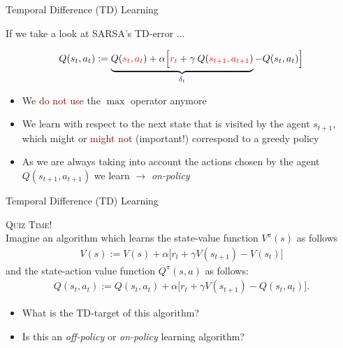 \documentclass{beamer}
\newenvironment{takeaway}[1]{%
	\definecolor{shadecolor}{gray}{0.9}%
		\begin{shaded}{\color{skymagenta}\noindent\textsc{#1}}\\%
		}{%
		\end{shaded}%
}
\begin{document}
\begin{frame}{Temporal Difference (TD) Learning}

		If we take a look at SARSA's TD-error ...

		\begin{align*}
			Q(s_t,a_t):=\underbrace{Q(\textcolor{red}{s_t,a_t}) + \alpha\Big[\textcolor{red}{r_t} + \gamma \: Q(\textcolor{red}{s_{t+1},a_{t+1}})}_{\textcolor{blue}{\delta_t}} - Q(s_t, a_t) \Big]
		\end{align*}


		\begin{itemize}
			\item We \textcolor{Maroon}{do not use} the $\max$ operator anymore
			\item We learn with respect to the next state that is visited by the agent $s_{t+1}$, which might or \textcolor{Maroon}{might not} (important!) correspond to a greedy policy
			\item As we are always taking into account the actions chosen by the agent $Q(s_{t+1}, a_{t+1})$ we learn $\rightarrow$ \textit{on-policy}
		\end{itemize}

\end{frame}



\begin{frame}{Temporal Difference (TD) Learning}
	
	\begin{takeaway}{Quiz Time!}
		Imagine an algorithm which learns the state-value function $V^{\pi}(s)$ as follows 
		\begin{align*}
			V(s):= V(s) + \alpha \big[r_{t} + \gamma V(s_{t+1}) - V(s_t) \big]
		\end{align*}
		and the state-action value function $Q^{\pi}(s,a)$ as follows:
		\begin{align*}
			Q(s_{t}, a_{t}):= Q(s_{t}, a_{t}) + \alpha \big[r_{t} + \gamma V(s_{t+1}) - Q(s_{t}, a_{t}) \big].
		\end{align*}
	\end{takeaway}

	\begin{itemize}
		\item What is the TD-target of this algorithm?
		\item Is this an \textit{off-policy} or \textit{on-policy} learning algorithm?
	\end{itemize}

\end{frame}
\end{document}
